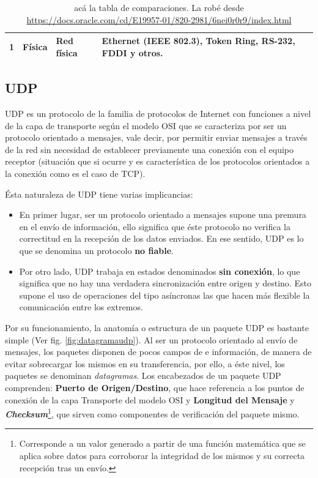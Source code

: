 \begin{table}[h!]
\begin{tabular}{|c|p{4cm}|l|p{5cm}|}
1                                                                                            & Física                                                                                           & Red física                                & Ethernet (IEEE 802.3), Token Ring, RS-232, FDDI y otros.                                              \\ \hline
\end{tabular}
\caption{acá la tabla de comparaciones. La robé desde \url{https://docs.oracle.com/cd/E19957-01/820-2981/6nei0r0r9/index.html}}
\label{tabla:tcpiposi}
\end{table}


\subsection{UDP}
UDP \cite{rfc:768} es un protocolo de la familia de protocolos de Internet con funciones a nivel de la capa de transporte según el modelo OSI que se caracteriza por ser un protocolo orientado a mensajes, vale decir, por permitir enviar mensajes a través de la red sin necesidad de establecer previamente una conexión con el equipo receptor (situación que si ocurre y es característica de los protocolos orientados a la conexión como es el caso de TCP).

Ésta naturaleza de UDP tiene varias implicancias:
\begin{itemize}
\item En primer lugar, ser un protocolo orientado a mensajes supone una premura en el envío de información, ello significa que éste protocolo no verifica la correctitud en la recepción de los datos enviados. En ese sentido, UDP es lo que se denomina un protocolo \textbf{no fiable}.
\item Por otro lado, UDP trabaja en estados denominados \textbf{sin conexión}, lo que significa que no hay una verdadera sincronización entre origen y destino. Esto supone el uso de operaciones del tipo asíncronas las que hacen más flexible la comunicación entre los extremos.
\end{itemize}

Por su funcionamiento, la anatomía o estructura de un paquete UDP es bastante simple (Ver fig. \ref{fig:datagramaudp}). Al ser un protocolo orientado al envío de mensajes, los paquetes disponen de pocos campos de e información, de manera de evitar sobrecargar los mismos en su transferencia, por ello, a éste nivel, los paquetes se denominan \emph{datagramas}. Los encabezados de un paquete UDP comprenden: \textbf{Puerto de Origen/Destino}, que hace referencia a los puntos de conexión de la capa Transporte del modelo OSI y \textbf{Longitud del Mensaje} y \textbf{\emph{Checksum}}\footnote{Corresponde a un valor generado a partir de una función matemática que se aplica sobre datos para corroborar la integridad de los mismos y su correcta recepción tras un envío.}, que sirven como componentes de verificación del paquete mismo.

